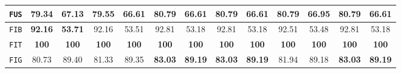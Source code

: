 \begin{sidewaystable}[htpb]
\begin{tabular}{| c | c c | c c | c c | c c | c c | c c |}
                \texttt{FUS} & 79.34 & 67.13 & 79.55 & 66.61 & 80.79 & 66.61 & 80.79 & 66.61 & \textbf{80.79} & \textbf{66.95} & 80.79 & 66.61 \\
                \hline
                \texttt{FIB} & \textbf{92.16} & \textbf{53.71} & 92.16 & 53.51 & 92.81 & 53.18 & 92.81 & 53.18 & 92.51 & 53.48 & 92.81 & 53.18 \\
                \hline
                \texttt{FIT} & \textbf{100} & \textbf{100} & \textbf{100} & \textbf{100} & \textbf{100} & \textbf{100} & \textbf{100} & \textbf{100} & \textbf{100} & \textbf{100} & \textbf{100} & \textbf{100} \\
                \hline
                \texttt{FIG} & 80.73 & 89.40 & 81.33 & 89.35 & \textbf{83.03} & \textbf{89.19} & \textbf{83.03} & \textbf{89.19} & 81.94 & 89.18 & \textbf{83.03} & \textbf{89.19} \\
                \hline
            \end{tabular}
            \caption{
                \label{tab::stats_gk_scat_svm_f3}
                \gls{acr::svm} results using graph kernels and \glspl{acr::scatnet}, expressed in percentage, on the two datasets at \textbf{\gls{acr::efin}} level 3.
            }
        \end{sidewaystable}

